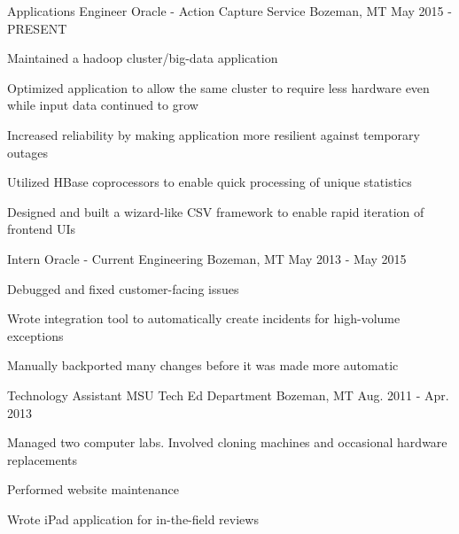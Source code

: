 

\begin{cventries}

  \cventry
    {Applications Engineer} %
    {Oracle - Action Capture Service} %
    {Bozeman, MT} %
    {May 2015 - PRESENT} %
    {
      \begin{cvitems} %
        \item {Maintained a hadoop cluster/big-data application}
        \item {Optimized application to allow the same cluster to require less hardware even while input data continued to grow}
        \item {Increased reliability by making application more resilient against temporary outages}
        \item {Utilized HBase coprocessors to enable quick processing of unique statistics}
        \item {Designed and built a wizard-like CSV framework to enable rapid iteration of frontend UIs}
      \end{cvitems}
    }

  \cventry
    {Intern} %
    {Oracle - Current Engineering} %
    {Bozeman, MT} %
    {May 2013 - May 2015} %
    {
      \begin{cvitems} %
        \item {Debugged and fixed customer-facing issues}
        \item {Wrote integration tool to automatically create incidents for high-volume exceptions}
        \item {Manually backported many changes before it was made more automatic}
      \end{cvitems}
    }

  \cventry
    {Technology Assistant} %
    {MSU Tech Ed Department} %
    {Bozeman, MT} %
    {Aug. 2011 - Apr. 2013} %
    {
      \begin{cvitems} %
        \item {Managed two computer labs. Involved cloning machines and occasional hardware replacements}
        \item {Performed website maintenance}
        \item {Wrote iPad application for in-the-field reviews}
      \end{cvitems}
    }

\end{cventries}
